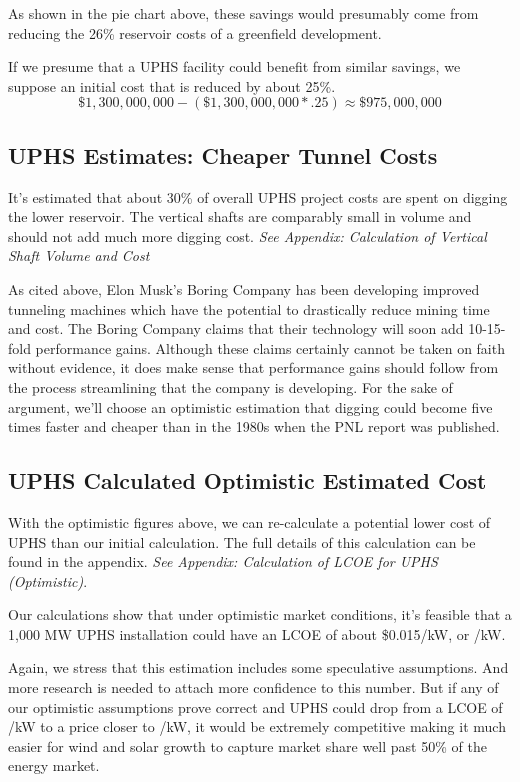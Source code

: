 \documentclass[hidelinks,12pt,a4paper]{article}
\begin{document}
As shown in the pie chart above, these savings would presumably come from reducing the 26\% reservoir costs of a greenfield development.

If we presume that a UPHS facility could benefit from similar savings, we suppose an initial cost that is reduced by about 25\%.
\[ \$1,300,000,000 - (\$1,300,000,000 * .25) \approx \$975,000,000\]

\subsection{UPHS Estimates: Cheaper Tunnel Costs}
It's estimated that about 30\% of overall UPHS project costs are spent on digging the lower reservoir. The vertical shafts are comparably small in volume and should not add much more digging cost. \textit{See Appendix: Calculation of Vertical Shaft Volume and Cost}

As cited above, Elon Musk's Boring Company has been developing improved tunneling machines which have the potential to drastically reduce mining time and cost. The Boring Company claims that their technology will soon add 10-15-fold performance gains. Although these claims certainly cannot be taken on faith without evidence, it does make sense that performance gains should follow from the process streamlining that the company is developing. For the sake of argument, we'll choose an optimistic estimation that digging could become five times faster and cheaper than in the 1980s when the PNL report was published.

\subsection{UPHS Calculated Optimistic Estimated Cost}
With the optimistic figures above, we can re-calculate a potential lower cost of UPHS than our initial calculation. The full details of this calculation can be found in the appendix. \textit{See Appendix: Calculation of LCOE for UPHS (Optimistic)}.

\begin{displayquote}
Our calculations show that under optimistic market conditions, it's feasible that a 1,000 MW UPHS installation could have an LCOE of about \$0.015/kW, or /kW.
\end{displayquote}

Again, we stress that this estimation includes some speculative assumptions. And more research is needed to attach more confidence to this number. But if any of our optimistic assumptions prove correct and UPHS could drop from a LCOE of /kW to a price closer to /kW, it would be extremely competitive making it much easier for wind and solar growth to capture market share well past 50\% of the energy market.
\end{document}
